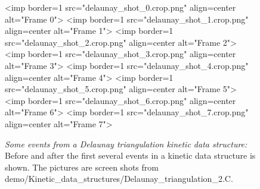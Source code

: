 \begin{figure}[htb]
\begin{ccTexOnly}
\begin{center}
\end{center}
\end{ccTexOnly}
\begin{ccHtmlOnly}
<imp border=1 src="delaunay_shot_0.crop.png" align=center alt="Frame 0">
<imp border=1 src="delaunay_shot_1.crop.png" align=center alt="Frame 1">
<imp border=1 src="delaunay_shot_2.crop.png" align=center alt="Frame 2">
<imp border=1 src="delaunay_shot_3.crop.png" align=center alt="Frame 3">
<imp border=1 src="delaunay_shot_4.crop.png" align=center alt="Frame 4">
<imp border=1 src="delaunay_shot_5.crop.png" align=center alt="Frame 5">
<imp border=1 src="delaunay_shot_6.crop.png" align=center alt="Frame 6">
<imp border=1 src="delaunay_shot_7.crop.png" align=center alt="Frame 7">
\end{ccHtmlOnly}
\caption{ \label{fig:delaunay_events} 
{\em Some events from a Delaunay triangulation kinetic data structure:} Before and after the first several events in a kinetic data structure is shown. The pictures are screen shots from demo/Kinetic\_data\_structures/Delaunay\_triangulation\_2.C. }
\end{figure}


\label{fig:delaunay_2_usage_program}
